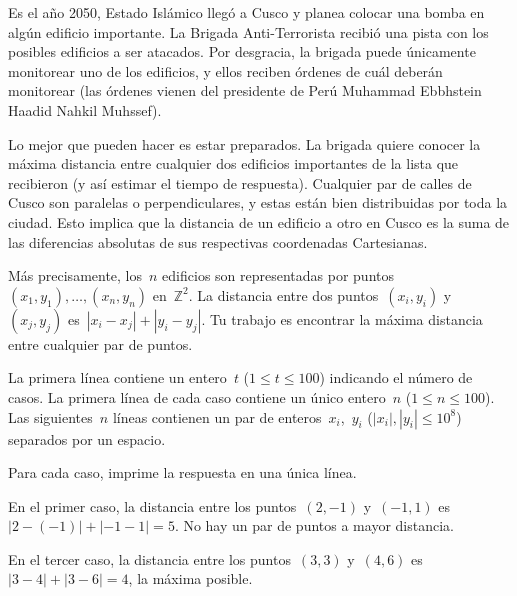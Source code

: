 
Es el año 2050, Estado Islámico llegó a Cusco y planea colocar una bomba en algún
edificio importante. La Brigada Anti-Terrorista recibió una pista con los posibles
edificios a ser atacados. Por desgracia, la brigada puede únicamente monitorear uno
de los edificios, y ellos reciben órdenes de cuál deberán monitorear (las órdenes
vienen del presidente de Perú Muhammad Ebbhstein Haadid Nahkil Muhssef).

Lo mejor que pueden hacer es estar preparados. La brigada quiere conocer la máxima
distancia entre cualquier dos edificios importantes de la lista que recibieron (y así
estimar el tiempo de respuesta). Cualquier par de calles de Cusco son paralelas o
perpendiculares, y estas están bien distribuidas por toda la ciudad. Esto implica que
la distancia de un edificio a otro en Cusco es la suma de las diferencias absolutas
de sus respectivas coordenadas Cartesianas.

Más precisamente, los~$n$ edificios son representadas por
puntos~$(x_1, y_1), \dots, (x_n, y_n)$ en~$\mathbb{Z}^2$. La distancia entre dos
puntos~$(x_i, y_i)$ y~$(x_j, y_j)$ es~$|x_i - x_j| + |y_i - y_j|$. Tu trabajo es
encontrar la máxima distancia entre cualquier par de puntos.



La primera línea contiene un entero~$t$ ($1 \leq t \leq 100$) indicando el número de
casos. La primera línea de cada caso contiene un único entero~$n$
($1 \leq n \leq 100$). Las siguientes~$n$ líneas contienen un par de
enteros~$x_i$,~$y_i$ ($|x_i|, |y_i| \leq 10^8$) separados por un espacio.

\outputText

Para cada caso, imprime la respuesta en una única línea.

\exampleCases

\begin{example}
\end{example}

\explanationText

En el primer caso, la distancia entre los puntos~$(2, -1)$ y~$(-1, 1)$
es~$|2 - (- 1)| + |-1 - 1| = 5$. No hay un par de puntos a mayor distancia.

En el tercer caso, la distancia entre los puntos~$(3, 3)$ y~$(4, 6)$
es~$|3 - 4| + |3 - 6| = 4$, la máxima posible.
